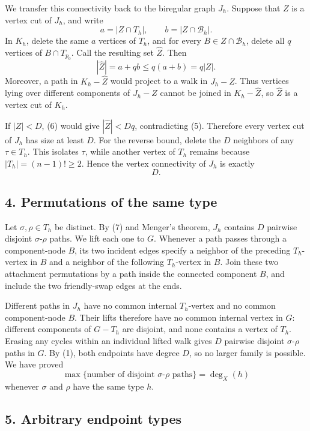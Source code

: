 \documentclass[11pt]{article}
\begin{document}
We transfer this connectivity back to the biregular graph \(J_h\). Suppose that \(Z\) is a vertex cut of \(J_h\), and write
\[
a=|Z\cap T_h|,\qquad b=|Z\cap\mathcal B_h|.
\]
In \(K_h\), delete the same \(a\) vertices of \(T_h\), and for every \(B\in Z\cap\mathcal B_h\), delete all \(q\) vertices of \(B\cap T_{p_0}\). Call the resulting set \(\widehat Z\). Then
\[
|\widehat Z|=a+qb\leq q(a+b)=q|Z|.\tag{6}
\]
Moreover, a path in \(K_h-\widehat Z\) would project to a walk in \(J_h-Z\). Thus vertices lying over different components of \(J_h-Z\) cannot be joined in \(K_h-\widehat Z\), so \(\widehat Z\) is a vertex cut of \(K_h\).

If \(|Z|<D\), (6) would give \(|\widehat Z|<Dq\), contradicting (5). Therefore every vertex cut of \(J_h\) has size at least \(D\). For the reverse bound, delete the \(D\) neighbors of any \(\tau\in T_h\). This isolates \(\tau\), while another vertex of \(T_h\) remains because \(|T_h|=(n-1)!\geq2\). Hence the vertex connectivity of \(J_h\) is exactly
\[
D.\tag{7}
\]

\subsection*{4. Permutations of the same type}

Let \(\sigma,\rho\in T_h\) be distinct. By (7) and Menger's theorem, \(J_h\) contains \(D\) pairwise disjoint \(\sigma\)-\(\rho\) paths. We lift each one to \(G\). Whenever a path passes through a component-node \(B\), its two incident edges specify a neighbor of the preceding \(T_h\)-vertex in \(B\) and a neighbor of the following \(T_h\)-vertex in \(B\). Join these two attachment permutations by a path inside the connected component \(B\), and include the two friendly-swap edges at the ends.

Different paths in \(J_h\) have no common internal \(T_h\)-vertex and no common component-node \(B\). Their lifts therefore have no common internal vertex in \(G\): different components of \(G-T_h\) are disjoint, and none contains a vertex of \(T_h\). Erasing any cycles within an individual lifted walk gives \(D\) pairwise disjoint \(\sigma\)-\(\rho\) paths in \(G\). By (1), both endpoints have degree \(D\), so no larger family is possible. We have proved
\[
\max\{\text{number of disjoint \(\sigma\)-\(\rho\) paths}\}=\deg_X(h)\tag{8}
\]
whenever \(\sigma\) and \(\rho\) have the same type \(h\).

\subsection*{5. Arbitrary endpoint types}
\end{document}
